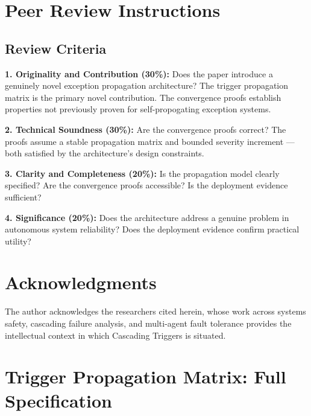\documentclass[12pt]{article}
\begin{document}
\section*{Peer Review Instructions}
\label{sec:peer-review}

\subsection*{Review Criteria}

\textbf{1. Originality and Contribution (30\%):} Does the paper introduce a genuinely novel exception propagation architecture? The trigger propagation matrix is the primary novel contribution. The convergence proofs establish properties not previously proven for self-propogating exception systems.

\textbf{2. Technical Soundness (30\%):} Are the convergence proofs correct? The proofs assume a stable propagation matrix and bounded severity increment --- both satisfied by the architecture's design constraints.

\textbf{3. Clarity and Completeness (20\%):} Is the propagation model clearly specified? Are the convergence proofs accessible? Is the deployment evidence sufficient?

\textbf{4. Significance (20\%):} Does the architecture address a genuine problem in autonomous system reliability? Does the deployment evidence confirm practical utility?

\section*{Acknowledgments}

The author acknowledges the researchers cited herein, whose work across systems safety, cascading failure analysis, and multi-agent fault tolerance provides the intellectual context in which Cascading Triggers is situated.


\section{Trigger Propagation Matrix: Full Specification}
\label{sec:matrix-spec}
\end{document}
